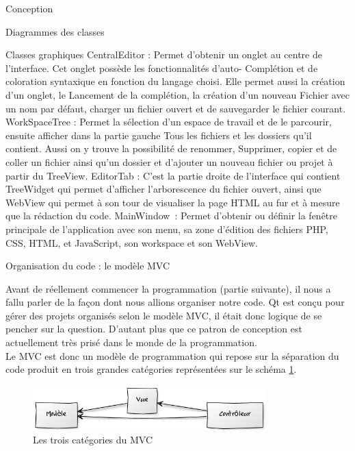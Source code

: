 \documentclass[a4paper, 12pt]{report}
\begin{document}
\begin{part}{Conception}
\begin{chapter}{Diagrammes des classes}
\begin{section}{Classes graphiques}
CentralEditor :
Permet d'obtenir un onglet au centre de l'interface. Cet onglet possède les fonctionnalités d'auto-
Complétion et de coloration syntaxique en fonction du langage choisi.
Elle permet aussi la création d'un onglet, le Lancement de la complétion, la création d'un nouveau
Fichier avec un nom par défaut, charger un fichier ouvert et de sauvegarder le fichier courant.
WorkSpaceTree :
Permet la sélection d'un espace de travail et de le parcourir, ensuite afficher dans la partie gauche
Tous les fichiers et les dossiers qu'il contient. Aussi on y trouve la possibilité de renommer,
Supprimer, copier et de coller un fichier ainsi qu'un dossier et d'ajouter un nouveau fichier ou projet
à partir du TreeView.
EditorTab :
C'est la partie droite de l'interface qui contient TreeWidget qui permet d'afficher l'arborescence du
fichier ouvert, ainsi que WebView qui permet à son tour de visualiser la page HTML au fur et à
mesure que la rédaction du code.
MainWindow :
Permet d’obtenir ou définir  la fenêtre principale de l'application  avec son menu, sa zone 
d’édition des fichiers PHP, CSS, HTML, et JavaScript, son workspace  et son WebView.
			\end{section}
		\end{chapter}
		\begin{chapter}{Organisation du code : le modèle MVC}

			Avant de réellement commencer la programmation (partie suivante), il nous a fallu parler de la façon dont nous allions organiser
			notre code. \gls{Qt} est conçu pour gérer des projets organisés selon le modèle \gls{MVC}, il était donc logique de se pencher
			sur la question. D'autant plus que ce patron de conception est actuellement très prisé dans le monde de la programmation.\\


			Le \gls{MVC} est donc un modèle de programmation qui repose sur la séparation du code produit en trois grandes catégories
			représentées sur le schéma \ref{sinistre}.\\
			\begin{figure}[ht]
					\begin{center}
						\includegraphics[width=9cm]{images/mvc.png}
						\caption{Les trois catégories du MVC}
						\label{sinistre}
					\end{center}
				\end{figure}~\\



\end{chapter}
\end{part}
\end{document}
